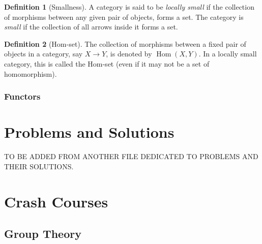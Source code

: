 \documentclass{scrbook}
\theoremstyle{definition}\newtheorem{defn}{Definition}
\theoremstyle{definition}\newtheorem*{rmk}{Remark}
\DeclareMathOperator{\Hom}{Hom}
\begin{document}
\begin{defn}[Smallness]
  A category is said to be \emph{locally small} if the collection of morphisms
  between any given pair of objects, forms a set. The category is \emph{small}
  if the collection of all arrows inside it forms a set.
\end{defn}

\begin{defn}[Hom-set]
  The collection of morphisms between a fixed
  pair of objects in a category, say $X \to Y$, is denoted by $\Hom(X, Y)$.
  In a locally small category, this is called the Hom-set (even if it may not
  be a set of homomorphism).
\end{defn}

\section{Functors}

\newpage

\part{Problems and Solutions}
\setcounter{chapter}{0}
TO BE ADDED FROM ANOTHER FILE DEDICATED TO PROBLEMS AND THEIR SOLUTIONS.

\part{Crash Courses}
\setcounter{chapter}{0}

\chapter{Group Theory}
\end{document}
